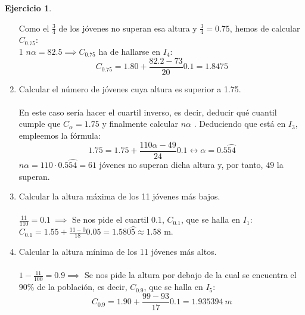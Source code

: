 \documentclass[a4paper, 12pt]{article}
\theoremstyle{definition}
\newtheorem{ej}{Ejercicio}
\begin{document}
\begin{ej}
\begin{enumerate}[label=\textit{\alph*)}]
    Como el $\frac{3}{4}$ de los jóvenes no superan esa altura y $\frac{3}{4}=0.75$, hemos de calcular $C_{0.75}$:
    \\
    1 $n\alpha = 82.5 \implies C_{0.75}$ ha de hallarse en $I_{4}$:
    $$C_{0.75} = 1.80 + \frac{82.2 - 73}{20}0.1 = 1.8475$$
    \item Calcular el número de jóvenes cuya altura es superior a 1.75. \\\\
    En este caso sería hacer el cuartil inverso, es decir, deducir qué cuantil cumple que $C_{\alpha} = 1.75$ y finalmente calcular $n\alpha$ . Deduciendo que está en $I_{3}$, empleemos la fórmula:
    $$1.75 = 1.75 + \frac{110\alpha - 49}{24}0.1 \longleftrightarrow \alpha = 0.5\wideparen{54}$$
    $n\alpha = 110 \cdot 0.5\wideparen{54} = 61$ jóvenes no superan dicha altura y, por tanto, $49$ la superan. \\
    \item Calcular la altura máxima de los 11 jóvenes más bajos.\\\\
    $\frac{11}{110} = 0.1 \ \implies$ Se nos pide el cuartil $0.1$, $C_{0.1}$, que se halla en $I_{1}$: \\
    $C_{0.1} = 1.55 + \frac{11-0}{18}0.05 = 1.580\wideparen{5} \approx 1.58$ m. \\
    \item Calcular la altura mínima de los 11 jóvenes más altos.
    \\\\
    $1-\frac{11}{100}=0.9 \implies$ Se nos pide la altura por debajo de la cual se encuentra el $90\%$ de la población, es decir, $C_{0.9}$, que se halla en $I_{5}$: \\
    $$C_{0.9} = 1.90 + \frac{99-93}{17}0.1 = 1.935394 \ m$$
\end{enumerate}
\end{ej}

\newpage
\end{document}
